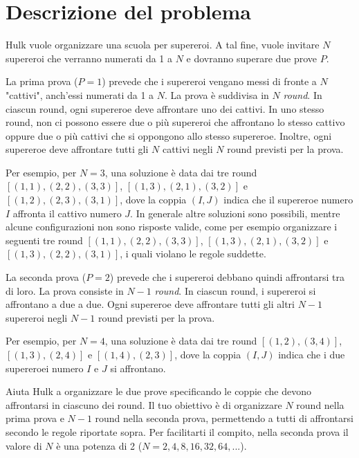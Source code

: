 \documentclass[a4paper,11pt]{article}
\begin{document}
\vspace{0.5cm}



\section*{Descrizione del problema}
  
Hulk vuole organizzare una scuola per supereroi. A tal fine, vuole
invitare $N$ supereroi che verranno numerati da 1
a $N$ e dovranno superare due prove $P$.

La prima prova ($P=1$) prevede che i supereroi vengano messi
di fronte a $N$ "cattivi", anch'essi numerati da 1
a $N$. La prova è suddivisa
in $N$ \emph{round}. In ciascun round, ogni supereroe deve
affrontare uno dei cattivi. In uno stesso round, non ci possono essere
due o più supereroi che affrontano lo stesso cattivo oppure due
o più cattivi che si oppongono allo stesso supereroe. Inoltre,
ogni supereroe deve affrontare tutti gli $N$ cattivi
negli $N$ round previsti per la prova.

Per esempio, per $N=3$, una soluzione
è data dai tre round $[(1,1), (2,2), (3,3)]$, $[(1,3), (2,1),
(3,2)]$ e $[(1,2), (2,3), (3,1)]$, dove la coppia $(I,J)$ indica
che il supereroe numero $I$ affronta il cattivo
numero $J$. In generale altre soluzioni sono possibili,
mentre alcune configurazioni non sono risposte valide, come per
esempio organizzare i seguenti tre round $[(1,1), (2,2), (3,3)]$,
$[(1,3), (2,1), (3,2)]$ e $[(1,3), (2,2), (3,1)]$, i quali violano le
regole suddette.

La seconda prova ($P=2$) prevede che i supereroi debbano
quindi affrontarsi tra di loro. La prova consiste
in $N-1$ \emph{round}. In ciascun round, i supereroi si
affrontano a due a due. Ogni supereroe deve affrontare tutti gli
altri $N-1$ supereroi negli $N-1$ round previsti per
la prova.

Per esempio, per $N=4$, una soluzione è data dai tre
round $[(1,2), (3,4)]$, $[(1,3), (2,4)]$ e $[(1,4), (2,3)]$, dove la
coppia $(I,J)$ indica che i due supereroei
numero $I$ e $J$ si affrontano.

Aiuta Hulk a organizzare le due prove specificando le coppie che
devono affrontarsi in ciascuno dei round. Il tuo obiettivo è di
organizzare $N$ round nella prima prova e $N-1$
round nella seconda prova, permettendo a tutti di affrontarsi secondo
le regole riportate sopra. Per facilitarti il compito, nella seconda
prova il valore di $N$ è una potenza di 2
($N = 2, 4, 8, 16, 32, 64, ...$). 
\end{document}
